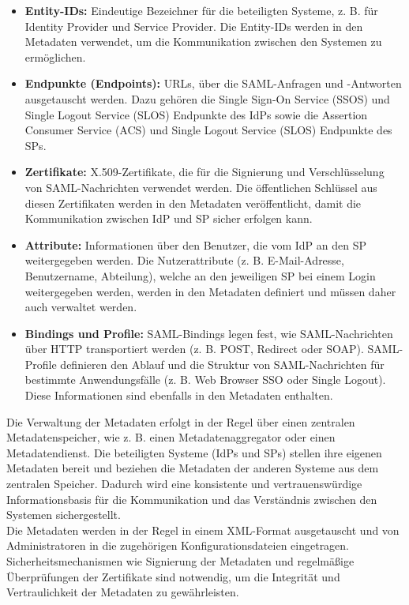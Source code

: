 \documentclass[a4paper, fontsize=11pt]{scrartcl}
\begin{document}
\begin{itemize}
    \item \textbf{Entity-IDs:} Eindeutige Bezeichner für die beteiligten Systeme, z. B. für Identity Provider und Service Provider. Die Entity-IDs werden in den Metadaten verwendet, um die Kommunikation zwischen den Systemen zu ermöglichen.
    \item \textbf{Endpunkte (Endpoints):} URLs, über die SAML-Anfragen und -Antworten ausgetauscht werden. Dazu gehören die Single Sign-On Service (SSOS) und Single Logout Service (SLOS) Endpunkte des IdPs sowie die Assertion Consumer Service (ACS) und Single Logout Service (SLOS) Endpunkte des SPs.
    \item \textbf{Zertifikate:} X.509-Zertifikate, die für die Signierung und Verschlüsselung von SAML-Nachrichten verwendet werden. Die öffentlichen Schlüssel aus diesen Zertifikaten werden in den Metadaten veröffentlicht, damit die Kommunikation zwischen IdP und SP sicher erfolgen kann.
    \item \textbf{Attribute:} Informationen über den Benutzer, die vom IdP an den SP weitergegeben werden. Die Nutzerattribute (z. B. E-Mail-Adresse, Benutzername, Abteilung), welche an den jeweiligen SP bei einem Login weitergegeben werden, werden in den Metadaten definiert und müssen daher auch verwaltet werden.
    \item \textbf{Bindings und Profile:} SAML-Bindings legen fest, wie SAML-Nachrichten über HTTP transportiert werden (z. B. POST, Redirect oder SOAP). SAML-Profile definieren den Ablauf und die Struktur von SAML-Nachrichten für bestimmte Anwendungsfälle (z. B. Web Browser SSO oder Single Logout). Diese Informationen sind ebenfalls in den Metadaten enthalten.
\end{itemize}

Die Verwaltung der Metadaten erfolgt in der Regel über einen zentralen Metadatenspeicher, wie z. B. einen Metadatenaggregator oder einen Metadatendienst. 
Die beteiligten Systeme (IdPs und SPs) stellen ihre eigenen Metadaten bereit und beziehen die Metadaten der anderen Systeme aus dem zentralen Speicher. 
Dadurch wird eine konsistente und vertrauenswürdige Informationsbasis für die Kommunikation und das Verständnis zwischen den Systemen sichergestellt.\\
Die Metadaten werden in der Regel in einem XML-Format ausgetauscht und von Administratoren in die zugehörigen Konfigurationsdateien eingetragen. 
Sicherheitsmechanismen wie Signierung der Metadaten und regelmäßige Überprüfungen der Zertifikate sind notwendig, um die Integrität und Vertraulichkeit der Metadaten zu gewährleisten.
\end{document}
